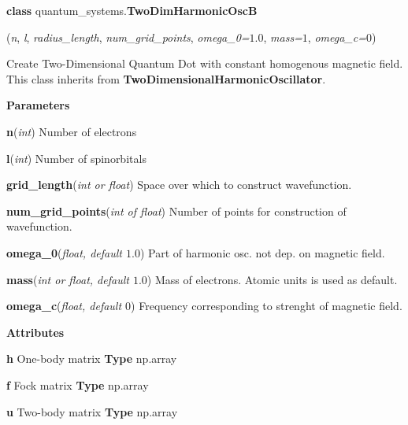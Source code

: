 
\begin{tcolorbox}
    {\selectfont
    \textbf{class} quantum\_systems.\textbf{TwoDimHarmonicOscB}

    \hspace{1em}(\emph{n}, \emph{l}, \emph{radius\_length}, \emph{num\_grid\_points}, 
    \emph{omega\_0=$1.0$}, \emph{mass=$1$}, \emph{omega\_c=$0$})

    \vspace{1em}
    Create Two-Dimensional Quantum Dot with constant homogenous magnetic field.
    This class inherits from \textbf{TwoDimensionalHarmonicOscillator}.
    \vspace{1em}

    \textbf{Parameters}

    \hspace{2em}\textbf{n}(\emph{int}) Number of electrons
    
    \hspace{2em}\textbf{l}(\emph{int}) Number of spinorbitals
    
    \hspace{2em}\textbf{grid\_length}(\emph{int or float}) Space over which to 
        construct wavefunction.
    
    \hspace{2em}\textbf{num\_grid\_points}(\emph{int of float}) Number of 
        points for construction of wavefunction.

    \hspace{2em}\textbf{omega\_0}(\emph{float, default $1.0$}) Part of harmonic 
        osc. not dep. on magnetic field. 
    
    \hspace{2em}\textbf{mass}(\emph{int or float, default $1.0$}) Mass of electrons.
        Atomic units is used as default.
    
    \hspace{2em}\textbf{omega\_c}(\emph{float, default $0$}) Frequency corresponding 
        to strenght of magnetic field.

    \vspace{1em}
    \textbf{Attributes}

    \hspace{2em} \textbf{h}
    One-body matrix 
    \textbf{Type} np.array
    
    \hspace{2em} \textbf{f}
    Fock matrix
    \textbf{Type} np.array

    \hspace{2em} \textbf{u}
    Two-body matrix
    \textbf{Type} np.array

}
\end{tcolorbox}
